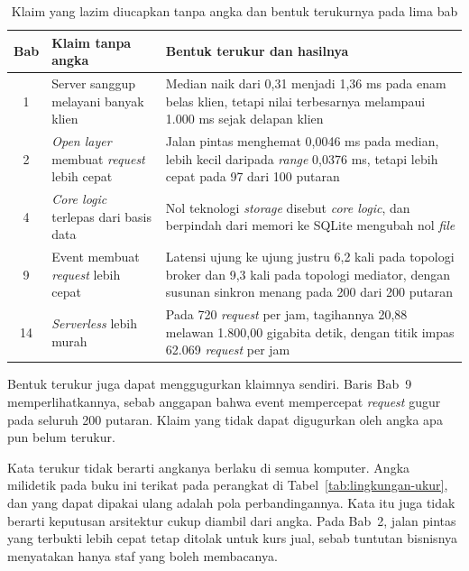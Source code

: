 \begin{table}[htbp]
  \centering
  \caption{Klaim yang lazim diucapkan tanpa angka dan bentuk terukurnya pada
    lima bab}
  \label{tab:klaim-terukur}
  \begin{tabularx}{\textwidth}{|c|>{\raggedright\arraybackslash}p{3.3cm}%
    |>{\raggedright\arraybackslash}X|}
    \hline
    \textbf{Bab} & \textbf{Klaim tanpa angka} &
      \textbf{Bentuk terukur dan hasilnya} \\
    \hline
    1 & Server sanggup melayani banyak klien & Median naik dari 0,31 menjadi
      1,36 ms pada enam belas klien, tetapi nilai terbesarnya melampaui
      1.000 ms sejak delapan klien \\
    \hline
    2 & \textit{Open layer} membuat \textit{request} lebih cepat & Jalan pintas
      menghemat 0,0046 ms pada median, lebih kecil daripada \textit{range}
      0,0376 ms, tetapi lebih cepat pada 97 dari 100 putaran \\
    \hline
    4 & \textit{Core logic} terlepas dari basis data & Nol teknologi
      \textit{storage} disebut \textit{core logic}, dan berpindah dari memori
      ke SQLite mengubah nol \textit{file} \\
    \hline
    9 & Event membuat \textit{request} lebih cepat & Latensi ujung ke ujung
      justru 6,2 kali pada topologi broker dan 9,3 kali pada topologi mediator,
      dengan susunan sinkron menang pada 200 dari 200 putaran \\
    \hline
    14 & \textit{Serverless} lebih murah & Pada 720 \textit{request} per jam,
      tagihannya 20,88 melawan 1.800,00 gigabita detik, dengan titik impas
      62.069 \textit{request} per jam \\
    \hline
  \end{tabularx}
\end{table}

Bentuk terukur juga dapat menggugurkan klaimnya sendiri. Baris Bab~9
memperlihatkannya, sebab anggapan bahwa event mempercepat \textit{request} gugur
pada seluruh 200 putaran. Klaim yang tidak dapat digugurkan oleh angka apa pun
belum terukur.

Kata terukur tidak berarti angkanya berlaku di semua komputer. Angka milidetik
pada buku ini terikat pada perangkat di Tabel~\ref{tab:lingkungan-ukur}, dan
yang dapat dipakai ulang adalah pola perbandingannya. Kata itu juga tidak
berarti keputusan arsitektur cukup diambil dari angka. Pada Bab~2, jalan pintas
yang terbukti lebih cepat tetap ditolak untuk kurs jual, sebab tuntutan bisnisnya
menyatakan hanya staf yang boleh membacanya.

